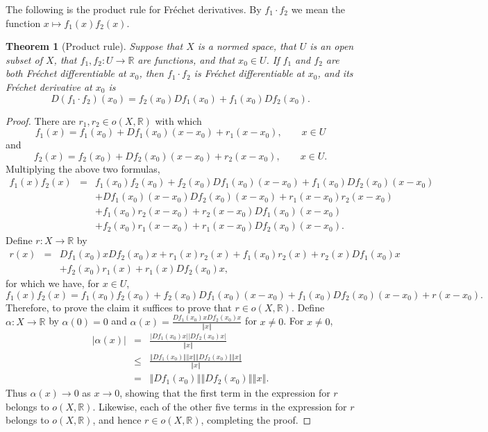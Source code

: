 \documentclass{article}
\newcommand{\norm}[1]{\left\Vert #1 \right\Vert}
\newtheorem{theorem}{Theorem}
\theoremstyle{definition}
\begin{document}
The following is the product rule for Fr\'echet derivatives. By $f_1 \cdot f_2$ we mean the function $x \mapsto f_1(x)f_2(x)$.

\begin{theorem}[Product rule]
Suppose that $X$ is a normed space, that $U$ is an open subset of $X$, that
$f_1,f_2:U \to \mathbb{R}$ are functions, and that $x_0 \in U$.
If $f_1$ and $f_2$ are both Fr\'echet differentiable at $x_0$, then $f_1\cdot f_2$ is Fr\'echet differentiable at $x_0$,
and its Fr\'echet derivative at $x_0$ is
\[
D(f_1\cdot f_2)(x_0)=f_2(x_0)Df_1(x_0)+f_1(x_0)Df_2(x_0).
\] 
\end{theorem}
\begin{proof}
There are $r_1,r_2 \in o(X,\mathbb{R})$ with which
\[
f_1(x)=f_1(x_0)+Df_1(x_0)(x-x_0)+r_1(x-x_0), \qquad x \in U
\]
and
\[
f_2(x)=f_2(x_0)+Df_2(x_0)(x-x_0)+r_2(x-x_0), \qquad x \in U.
\]
Multiplying the above two formulas, 
\begin{eqnarray*}
f_1(x)f_2(x)&=&f_1(x_0)f_2(x_0)+f_2(x_0)Df_1(x_0)(x-x_0)+f_1(x_0)Df_2(x_0)(x-x_0)\\
&&+Df_1(x_0)(x-x_0) Df_2(x_0)(x-x_0)+r_1(x-x_0)r_2(x-x_0)\\
&&+f_1(x_0)r_2(x-x_0)+r_2(x-x_0) Df_1(x_0)(x-x_0)\\
&&+f_2(x_0)r_1(x-x_0)+r_1(x-x_0)Df_2(x_0)(x-x_0).
\end{eqnarray*}
Define $r:X \to \mathbb{R}$ by
\begin{eqnarray*}
r(x)&=&Df_1(x_0)x Df_2(x_0)x + r_1(x)r_2(x)+f_1(x_0)r_2(x)+r_2(x)Df_1(x_0)x\\
&&+f_2(x_0)r_1(x)+r_1(x)Df_2(x_0)x,
\end{eqnarray*}
for which we have, for $x \in U$,
\[
f_1(x)f_2(x) = f_1(x_0)f_2(x_0)+f_2(x_0)Df_1(x_0)(x-x_0)+f_1(x_0)Df_2(x_0)(x-x_0) + r(x-x_0).
\]
Therefore, to prove the claim it suffices to prove that $r \in o(X,\mathbb{R})$.
Define $\alpha:X \to \mathbb{R}$ by $\alpha(0)=0$ and $\alpha(x)=\frac{Df_1(x_0)x Df_2(x_0)x}{\norm{x}}$ for $x \neq 0$.
For $x \neq 0$,
\begin{eqnarray*}
|\alpha(x)| &=& \frac{|Df_1(x_0)x| |Df_2(x_0)x|}{\norm{x}}\\
& \leq& \frac{\norm{Df_1(x_0)} \norm{x} \norm{Df_2(x_0)} \norm{x}}{\norm{x}}\\
&=&\norm{Df_1(x_0)} \norm{Df_2(x_0)} \norm{x}.
\end{eqnarray*}
Thus $\alpha(x) \to 0$ as $x \to 0$, showing that the first term in the expression for $r$ belongs to $o(X,\mathbb{R})$. Likewise,
each of the other five terms in the expression for $r$ belongs to $o(X,\mathbb{R})$, and hence $r \in o(X,\mathbb{R})$, completing
the proof.
\end{proof}
\end{document}
